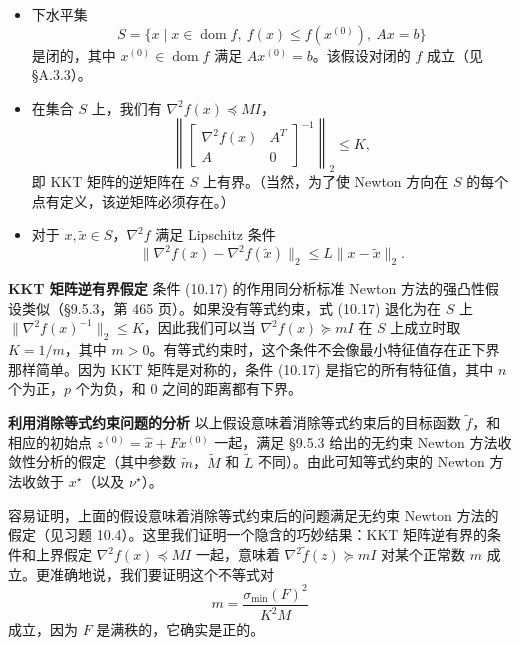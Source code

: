 \documentclass[UTF8, 12pt, fontset=fandol, oneside]{ctexart}
\begin{document}
\begin{itemize}
\item 下水平集
\[
S=\{x\mid x\in\operatorname{dom} f,\ f(x)\leq f(x^{(0)}),\ Ax=b\}
\]
是闭的，其中 $x^{(0)}\in\operatorname{dom} f$ 满足 $Ax^{(0)}=b$。该假设对闭的 $f$ 成立（见 \S A.3.3）。
\item 在集合 $S$ 上，我们有 $\nabla^2 f(x)\preceq MI$，
\begin{equation}
\left\|
\begin{bmatrix}
\nabla^2 f(x) & A^T\\
A & 0
\end{bmatrix}^{-1}
\right\|_2\leq K,
\tag{10.17}
\end{equation}
即 KKT 矩阵的逆矩阵在 $S$ 上有界。（当然，为了使 Newton 方向在 $S$ 的每个点有定义，该逆矩阵必须存在。）
\item 对于 $x,\tilde{x}\in S$，$\nabla^2 f$ 满足 Lipschitz 条件
\[
\|\nabla^2 f(x)-\nabla^2 f(\tilde{x})\|_2\leq L\|x-\tilde{x}\|_2.
\]
\end{itemize}

\noindent\textbf{KKT 矩阵逆有界假定}\quad
条件 (10.17) 的作用同分析标准 Newton 方法的强凸性假设类似（\S9.5.3，第 465 页）。如果没有等式约束，式 (10.17) 退化为在 $S$ 上 $\|\nabla^2 f(x)^{-1}\|_2\leq K$，因此我们可以当 $\nabla^2 f(x)\succeq mI$ 在 $S$ 上成立时取 $K=1/m$，其中 $m>0$。有等式约束时，这个条件不会像最小特征值存在正下界那样简单。因为 KKT 矩阵是对称的，条件 (10.17) 是指它的所有特征值，其中 $n$ 个为正，$p$ 个为负，和 $0$ 之间的距离都有下界。

\noindent\textbf{利用消除等式约束问题的分析}\quad
以上假设意味着消除等式约束后的目标函数 $\tilde{f}$，和相应的初始点 $z^{(0)}=\hat{x}+Fx^{(0)}$ 一起，满足 \S9.5.3 给出的无约束 Newton 方法收敛性分析的假定（其中参数 $\tilde{m}$，$\tilde{M}$ 和 $\tilde{L}$ 不同）。由此可知等式约束的 Newton 方法收敛于 $x^\star$（以及 $\nu^\star$）。

容易证明，上面的假设意味着消除等式约束后的问题满足无约束 Newton 方法的假定（见习题 10.4）。这里我们证明一个隐含的巧妙结果：KKT 矩阵逆有界的条件和上界假定 $\nabla^2 f(x)\preceq MI$ 一起，意味着 $\nabla^2\tilde{f}(z)\succeq mI$ 对某个正常数 $m$ 成立。更准确地说，我们要证明这个不等式对
\begin{equation}
m=\frac{\sigma_{\min}(F)^2}{K^2M}
\tag{10.18}
\end{equation}
成立，因为 $F$ 是满秩的，它确实是正的。
\end{document}
